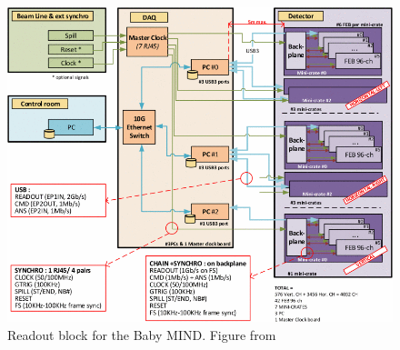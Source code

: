 \begin{figure}[h!]
\centering
\includegraphics[width=\textwidth]{figures/fullDAQ.png}
\caption{Readout block for the Baby MIND. Figure from \cite{52Georgi}}
\label{fig:daqChain}
\end{figure}





